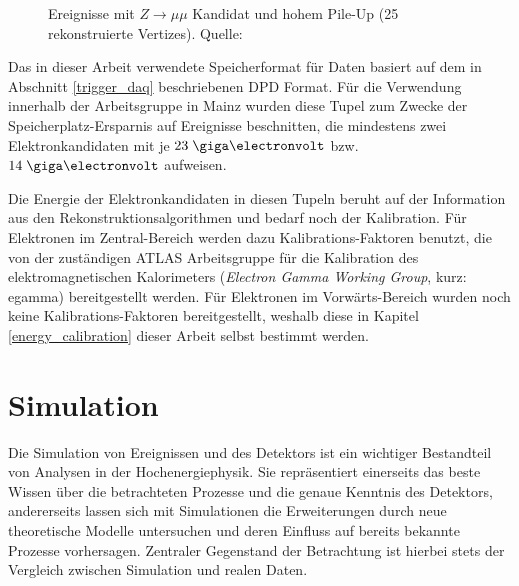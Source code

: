 \begin{figure}
\begin{minipage}[b]{0.48\textwidth}
        \captionsetup{format=plain}
        \caption[Ereignisse mit $Z \rightarrow \mu\mu$ Kandidat und hohem
            Pile-Up]
            {Ereignisse mit $Z \rightarrow \mu\mu$ Kandidat und hohem Pile-Up
            (25 rekonstruierte Vertizes). Quelle: \cite{ATLAS:Public}}
        \label{fig:pileup}
    \end{minipage}
\end{figure}

Das in dieser Arbeit verwendete Speicherformat für Daten basiert auf dem in
Abschnitt \ref{trigger_daq} beschriebenen DPD Format. Für die Verwendung
innerhalb der Arbeitsgruppe in Mainz wurden diese Tupel zum Zwecke der
Speicherplatz-Ersparnis auf Ereignisse beschnitten, die mindestens zwei
Elektronkandidaten mit je $23 \GeV$ bzw. $14 \GeV$ aufweisen.

Die Energie der Elektronkandidaten in diesen Tupeln beruht auf der Information
aus den Rekonstruktionsalgorithmen und bedarf noch der Kalibration. Für
Elektronen im Zentral-Bereich werden dazu Kalibrations-Faktoren benutzt, die
von der zuständigen ATLAS Arbeitsgruppe für die Kalibration des
elektromagnetischen Kalorimeters (\textit{Electron Gamma Working Group}, kurz:
egamma) bereitgestellt werden. Für Elektronen im Vorwärts-Bereich wurden noch
keine Kalibrations-Faktoren bereitgestellt, weshalb diese in Kapitel
\ref{energy_calibration} dieser Arbeit selbst bestimmt werden.



\section{Simulation}
\label{data_sim_selection:simulation}


Die Simulation von Ereignissen und des Detektors ist ein wichtiger Bestandteil
von Analysen in der Hochenergiephysik. Sie repräsentiert einerseits das
beste Wissen über die betrachteten Prozesse und die genaue Kenntnis des
Detektors, andererseits lassen sich mit Simulationen die Erweiterungen durch
neue theoretische Modelle untersuchen und deren Einfluss auf bereits bekannte
Prozesse vorhersagen. Zentraler Gegenstand der Betrachtung ist hierbei stets
der Vergleich zwischen Simulation und realen Daten.




